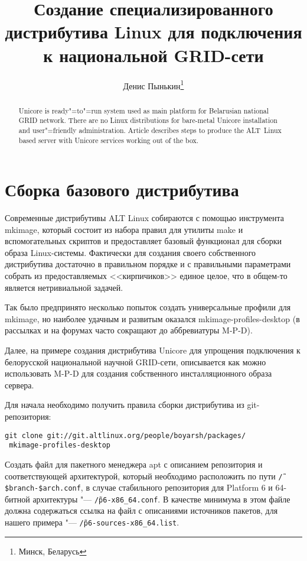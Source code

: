 \documentclass[10pt, a5paper]{article}
\begin{document}
\title{Создание специализированного дистрибутива Linux для подключения к национальной GRID-сети}
\author{Денис Пынькин\footnote{Минск, Беларусь}}
\def\progref!#1!{\texttt{#1}}

\maketitle

\begin{abstract}
Unicore is ready"=to"=run system used as main platform for Be\-la\-ru\-sian national GRID network. 
There are no Linux distributions for bare-metal Unicore installation and user"=friendly admi\-ni\-stra\-tion. 
Article describes steps to produce the ALT~Linux based server with Unicore services working out of the box.
\end{abstract}

\section*{Сборка базового дистрибутива}
Современные дистрибутивы ALT Linux собираются с помощью инструмента mkimage,
который состоит из набора правил для утилиты make и вспомогательных скриптов 
и предоставляет базовый функционал для сборки образа Linux-системы. 
Фактически для создания своего собственного дистрибутива достаточно в 
правильном порядке и с правильными параметрами собрать из предоставляемых 
<<кирпичиков>> единое целое, что в общем-то является нетривиальной задачей.

Так было предпринято несколько попыток создать универсальные профили для mkimage,
но наиболее удачным и развитым оказался mkimage-profiles-desktop 
(в рассылках и на форумах часто сокращают до аббревиатуры M-P-D).

Далее, на примере создания дистрибутива Unicore для упрощения подключения к 
белорусской национальной научной GRID-сети, описывается как можно 
использовать M-P-D для создания собственного инсталляционного образа сервера.

Для начала необходимо получить правила сборки дистрибутива из git-репозитория:
\begin{verbatim}
git clone git://git.altlinux.org/people/boyarsh/packages/
 mkimage-profiles-desktop
\end{verbatim}

 Создать файл для пакетного менеджера apt с описанием репозитория и соответствующей 
 архитектурой, который необходимо расположить по пути {\tt \~/\$branch-\$arch.conf}, 
 в случае стабильного репозитория для Platform 6 и 64-битной архитектуры "--- \linebreak 
 {\tt \~/p6-x86\_64.conf}. В качестве минимума в этом файле должна содержаться 
 ссылка на файл с описаниями источников пакетов, для нашего примера "---
 {\tt \~/p6-sources-x86\_64.list}.
\end{document}
